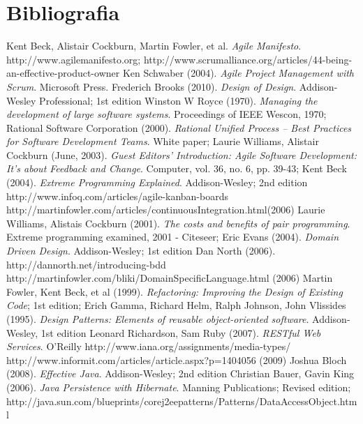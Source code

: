 \section{Bibliografia}

\begin{thebibliography}{30} 

 Kent Beck, Alistair Cockburn, Martin Fowler, et al. \textit{Agile Manifesto}. http://www.agilemanifesto.org;
 http://www.scrumalliance.org/articles/44-being-an-effective-product-owner
 Ken Schwaber (2004). \textit{Agile Project Management with Scrum}. Microsoft Press.
 Frederich Brooks (2010). \textit{Design of Design}. Addison-Wesley Professional; 1st edition
 Winston W Royce (1970). \textit{Managing the development of large software systems}.
Proceedings of IEEE Wescon, 1970;
 Rational Software Corporation (2000). \textit{Rational Unified Process -- Best Practices for Software Development Teams}. White paper;
 Laurie Williams, Alistair Cockburn (June, 2003). \textit{Guest Editors' Introduction: Agile Software Development: It's about Feedback and Change}. Computer, vol. 36, no. 6, pp. 39-43;
 Kent Beck (2004). \textit{Extreme Programming Explained}. Addison-Wesley; 2nd edition
 http://www.infoq.com/articles/agile-kanban-boards
 http://martinfowler.com/articles/continuousIntegration.html(2006)
 Laurie Williams, Alistais Cockburn (2001). \textit{The costs and benefits of pair programming}. Extreme programming examined, 2001 - Citeseer;
 Eric Evans (2004). \textit{Domain Driven Design}. Addison-Wesley; 1st edition
 Dan North (2006). http://dannorth.net/introducing-bdd
 http://martinfowler.com/bliki/DomainSpecificLanguage.html (2006)
 Martin Fowler, Kent Beck, et al (1999). \textit{Refactoring: Improving the Design of Existing Code}; 1st edition;
 Erich Gamma, Richard Helm, Ralph Johnson, John Vlissides (1995). \textit{Design Patterns: Elements of reusable object-oriented software}. Addison-Wesley, 1st edition
 Leonard Richardson, Sam Ruby (2007). \textit{RESTful Web Services}. O'Reilly
 http://www.iana.org/assignments/media-types/
 http://www.informit.com/articles/article.aspx?p=1404056 (2009)
 Joshua Bloch (2008). \textit{Effective Java}. Addison-Wesley; 2nd edition
 Christian Bauer, Gavin King (2006). \textit{Java Persistence with Hibernate}. Manning Publications; Revised edition;
 http://java.sun.com/blueprints/corej2eepatterns/Patterns/DataAccessObject.html


\end{thebibliography}
